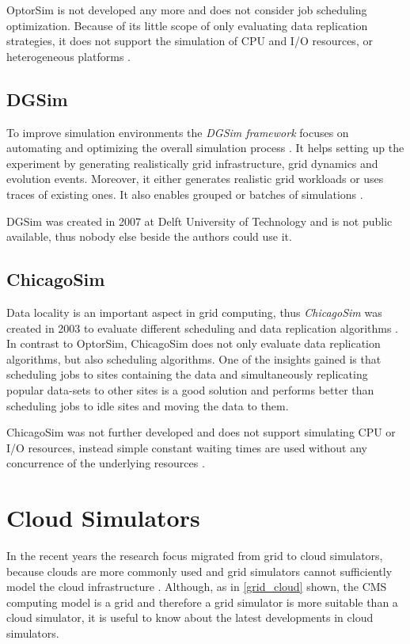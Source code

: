 OptorSim is not developed any more and does not consider job scheduling optimization. Because of its little scope of only evaluating data replication strategies, it does not support the simulation of CPU and I/O resources, or heterogeneous platforms \cite{optorsim}.


\subsection{DGSim}
To improve simulation environments the \textit{DGSim framework} focuses on automating and optimizing the overall simulation process \cite{dgsim}. It helps setting up the experiment by generating realistically grid infrastructure, grid dynamics and evolution events. Moreover, it either generates realistic grid workloads or uses traces of existing ones. It also enables grouped or batches of simulations \cite{dgsim}.

DGSim was created in 2007 at Delft University of Technology and is not public available, thus nobody else beside the authors could use it.


\subsection{ChicagoSim}
Data locality is an important aspect in grid computing, thus \textit{ChicagoSim} was created in 2003 to evaluate different scheduling and data replication algorithms \cite{chicagosim}. In contrast to OptorSim, ChicagoSim does not only evaluate data replication algorithms, but also scheduling algorithms. 
One of the insights gained is that scheduling jobs to sites containing the data and simultaneously replicating popular data-sets to other sites is a good solution and performs better than scheduling jobs to idle sites and moving the data to them.

ChicagoSim was not further developed and does not support simulating CPU or I/O resources, instead simple constant waiting times are used without any concurrence of the underlying resources \cite{chicagosim}. 


\newpage
\section{Cloud Simulators}
In the recent years the research focus migrated from grid to cloud simulators, because clouds are more commonly used and grid simulators cannot sufficiently model the cloud infrastructure \cite{compare_grid_cloud}. Although, as in \cref{grid_cloud} shown, the CMS computing model is a grid and therefore a grid simulator is more suitable than a cloud simulator, it is useful to know about the latest developments in cloud simulators. 

